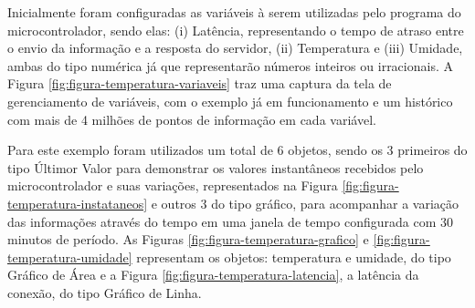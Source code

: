    	\begin{figure}[!h]
		
    	\end{figure}
    	
Inicialmente foram configuradas as variáveis à serem utilizadas pelo programa do microcontrolador, sendo elas: (i) Latência, representando o tempo de atraso entre o envio da informação e a resposta do servidor, (ii) Temperatura e (iii) Umidade, ambas do tipo numérica já que representarão números inteiros ou irracionais. A Figura \ref{fig:figura-temperatura-variaveis} traz uma captura da tela de gerenciamento de variáveis, com o exemplo já em funcionamento e um histórico com mais de 4 milhões de pontos de informação em cada variável.

        \begin{figure}[!h]
    	\end{figure}
    	
Para este exemplo foram utilizados um total de 6 objetos, sendo os 3 primeiros do tipo Últimor Valor para demonstrar os valores instantâneos recebidos pelo microcontrolador e suas variações, representados na Figura \ref{fig:figura-temperatura-instataneos} e outros 3 do tipo gráfico, para acompanhar a variação das informações através do tempo em uma janela de tempo configurada com 30 minutos de período. As Figuras \ref{fig:figura-temperatura-grafico} e  \ref{fig:figura-temperatura-umidade} representam os objetos: temperatura e umidade, do tipo Gráfico de Área e a Figura \ref{fig:figura-temperatura-latencia}, a latência da conexão, do tipo Gráfico de Linha.

